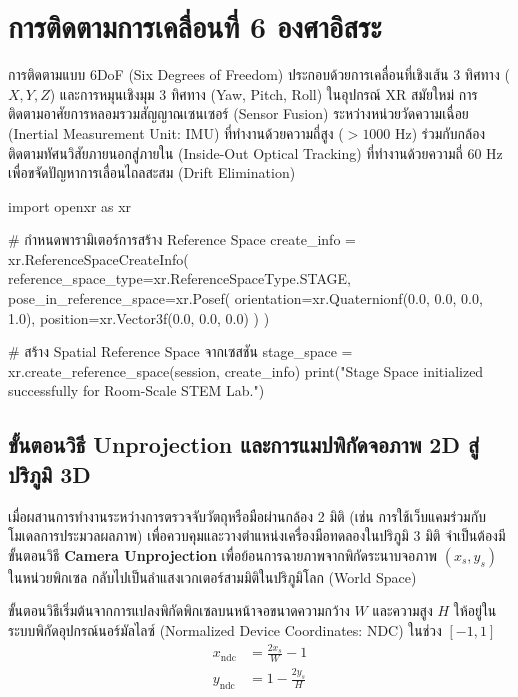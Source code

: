 \section{การติดตามการเคลื่อนที่ 6 องศาอิสระ}

การติดตามแบบ 6DoF (Six Degrees of Freedom) ประกอบด้วยการเคลื่อนที่เชิงเส้น 3 ทิศทาง ($X, Y, Z$) และการหมุนเชิงมุม 3 ทิศทาง (Yaw, Pitch, Roll) ในอุปกรณ์ XR สมัยใหม่ การติดตามอาศัยการหลอมรวมสัญญาณเซนเซอร์ (Sensor Fusion) ระหว่างหน่วยวัดความเฉื่อย (Inertial Measurement Unit: IMU) ที่ทำงานด้วยความถี่สูง ($>1000\text{ Hz}$) ร่วมกับกล้องติดตามทัศนวิสัยภายนอกสู่ภายใน (Inside-Out Optical Tracking) ที่ทำงานด้วยความถี่ $60\text{ Hz}$ เพื่อขจัดปัญหาการเลื่อนไถลสะสม (Drift Elimination)

\begin{codebox}
import openxr as xr

# กำหนดพารามิเตอร์การสร้าง Reference Space
create_info = xr.ReferenceSpaceCreateInfo(
    reference_space_type=xr.ReferenceSpaceType.STAGE,
    pose_in_reference_space=xr.Posef(
        orientation=xr.Quaternionf(0.0, 0.0, 0.0, 1.0),
        position=xr.Vector3f(0.0, 0.0, 0.0)
    )
)

# สร้าง Spatial Reference Space จากเซสชัน
stage_space = xr.create_reference_space(session, create_info)
print("Stage Space initialized successfully for Room-Scale STEM Lab.")
\end{codebox}

\subsection{ขั้นตอนวิธี Unprojection และการแมปพิกัดจอภาพ 2D สู่ปริภูมิ 3D}

เมื่อผสานการทำงานระหว่างการตรวจจับวัตถุหรือมือผ่านกล้อง 2 มิติ (เช่น การใช้เว็บแคมร่วมกับโมเดลการประมวลผลภาพ) เพื่อควบคุมและวางตำแหน่งเครื่องมือทดลองในปริภูมิ 3 มิติ จำเป็นต้องมีขั้นตอนวิธี \textbf{Camera Unprojection} เพื่อย้อนการฉายภาพจากพิกัดระนาบจอภาพ $(x_s, y_s)$ ในหน่วยพิกเซล กลับไปเป็นลำแสงเวกเตอร์สามมิติในปริภูมิโลก (World Space)

ขั้นตอนวิธีเริ่มต้นจากการแปลงพิกัดพิกเซลบนหน้าจอขนาดความกว้าง $W$ และความสูง $H$ ให้อยู่ในระบบพิกัดอุปกรณ์นอร์มัลไลซ์ (Normalized Device Coordinates: NDC) ในช่วง $[-1, 1]$
\begin{align}
x_{\text{ndc}} &= \frac{2 x_s}{W} - 1 \label{eq:ndc_x} \\
y_{\text{ndc}} &= 1 - \frac{2 y_s}{H} \label{eq:ndc_y}
\end{align}

